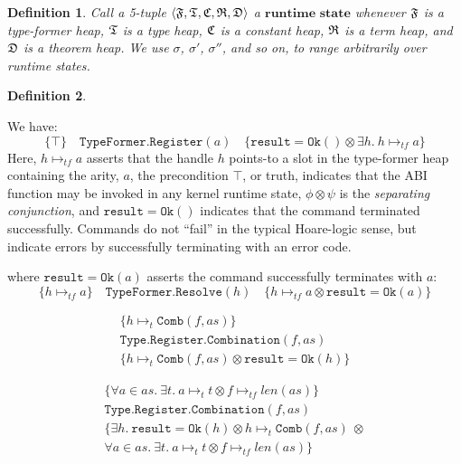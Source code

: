 \documentclass[a4paper, 10pt]{article}
\newtheorem{definition}{Definition}[section]
\newcommand{\deffont}[1]{\ensuremath{\textbf{#1}}}
\newcommand{\fall}[1]{\forall{#1}.\ }
\newcommand{\xsts}[1]{\exists{#1}.\ }
\begin{document}
\begin{definition}
\label{defn.runtime.state}
Call a 5-tuple $\langle \frak{F}, \frak{T}, \frak{C}, \frak{R}, \frak{D} \rangle$ a \deffont{runtime state} whenever $\frak{F}$ is a type-former heap, $\frak{T}$ is a type heap, $\frak{C}$ is a constant heap, $\frak{R}$ is a term heap, and $\frak{D}$ is a theorem heap.
We use $\sigma$, $\sigma'$, $\sigma''$, and so on, to range arbitrarily over runtime states.
\end{definition}

\begin{definition}
\label{defn.command.result}
\end{definition}

We have:
\begin{displaymath}
\{ \top \}\quad \mathtt{TypeFormer.Register}(a)\quad \{ \mathtt{result} = \mathtt{Ok}() \otimes \exists h.\ h \mapsto_{tf} a \}
\end{displaymath}
Here, $h \mapsto_{tf} a$ asserts that the handle $h$ points-to a slot in the type-former heap containing the arity, $a$, the precondition $\top$, or truth, indicates that the ABI function may be invoked in any kernel runtime state, $\phi \otimes \psi$ is the \emph{separating conjunction}, and $\mathtt{result} = \mathtt{Ok}()$ indicates that the command terminated successfully.
Commands do not ``fail'' in the typical Hoare-logic sense, but indicate errors by successfully terminating with an error code.

where $\mathtt{result} = \mathtt{Ok}(a)$ asserts the command successfully terminates with $a$:
\begin{displaymath}
\{ h \mapsto_{tf} a \}\quad \mathtt{TypeFormer.Resolve}(h) \quad\{ h \mapsto_{tf} a \otimes \mathtt{result} = \mathtt{Ok}(a) \}
\end{displaymath}

\begin{minipage}[t]{0.5\linewidth}
\begin{gather*}
\{ h \mapsto_{t} \mathtt{Comb}(f, as) \} \\
\mathtt{Type.Register.Combination}(f, as) \\
\{ h \mapsto_{t} \mathtt{Comb}(f, as) \otimes \mathtt{result} = \mathtt{Ok}(h) \}
\end{gather*}
\end{minipage}
\;
\begin{minipage}[t]{0.5\linewidth}
\begin{gather*}
\{ \fall{a\in as}\xsts{t} a \mapsto_t t \otimes f \mapsto_{tf} len(as) \} \\
\mathtt{Type.Register.Combination}(f, as) \\
\{ \xsts{h}\mathtt{result} = \mathtt{Ok}(h) \otimes h \mapsto_t \mathtt{Comb}(f, as)\ \otimes \\ \fall{a\in as}\xsts{t} a \mapsto_t t \otimes f \mapsto_{tf} len(as)\}
\end{gather*}
\end{minipage}
\end{document}
